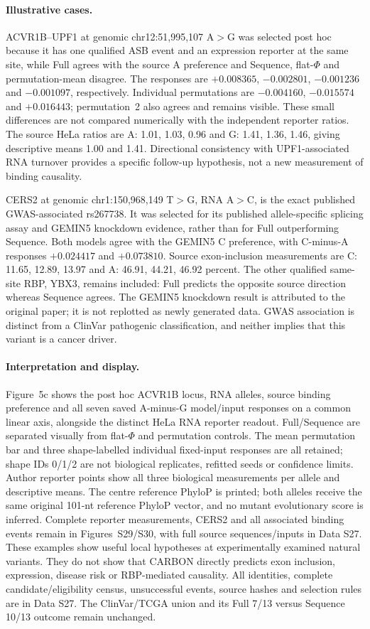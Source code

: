 \paragraph{Illustrative cases.} ACVR1B--UPF1 at genomic chr12:51,995,107 A$>$G was selected post hoc because it has one qualified ASB event and an expression reporter at the same site, while Full agrees with the source A preference and Sequence, flat-$\Phi$ and permutation-mean disagree. The responses are $+0.008365$, $-0.002801$, $-0.001236$ and $-0.001097$, respectively. Individual permutations are $-0.004160$, $-0.015574$ and $+0.016443$; permutation~2 also agrees and remains visible. These small differences are not compared numerically with the independent reporter ratios. The source HeLa ratios are A: 1.01, 1.03, 0.96 and G: 1.41, 1.36, 1.46, giving descriptive means 1.00 and 1.41. Directional consistency with UPF1-associated RNA turnover provides a specific follow-up hypothesis, not a new measurement of binding causality.

CERS2 at genomic chr1:150,968,149 T$>$G, RNA A$>$C, is the exact published GWAS-associated rs267738. It was selected for its published allele-specific splicing assay and GEMIN5 knockdown evidence, rather than for Full outperforming Sequence. Both models agree with the GEMIN5 C preference, with C-minus-A responses $+0.024417$ and $+0.073810$. Source exon-inclusion measurements are C: 11.65, 12.89, 13.97 and A: 46.91, 44.21, 46.92 percent. The other qualified same-site RBP, YBX3, remains included: Full predicts the opposite source direction whereas Sequence agrees. The GEMIN5 knockdown result is attributed to the original paper; it is not replotted as newly generated data. GWAS association is distinct from a ClinVar pathogenic classification, and neither implies that this variant is a cancer driver.

\paragraph{Interpretation and display.} Figure~5c shows the post hoc ACVR1B locus, RNA alleles, source binding preference and all seven saved A-minus-G model/input responses on a common linear axis, alongside the distinct HeLa RNA reporter readout. Full/Sequence are separated visually from flat-$\Phi$ and permutation controls. The mean permutation bar and three shape-labelled individual fixed-input responses are all retained; shape IDs 0/1/2 are not biological replicates, refitted seeds or confidence limits. Author reporter points show all three biological measurements per allele and descriptive means. The centre reference PhyloP is printed; both alleles receive the same original 101-nt reference PhyloP vector, and no mutant evolutionary score is inferred. Complete reporter measurements, CERS2 and all associated binding events remain in Figures~S29/S30, with full source sequences/inputs in Data S27. These examples show useful local hypotheses at experimentally examined natural variants. They do not show that CARBON directly predicts exon inclusion, expression, disease risk or RBP-mediated causality. All identities, complete candidate/eligibility census, unsuccessful events, source hashes and selection rules are in Data S27. The ClinVar/TCGA union and its Full 7/13 versus Sequence 10/13 outcome remain unchanged.
